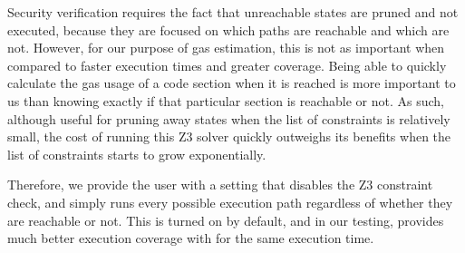 Security verification requires the fact that unreachable states are pruned and not executed, because 
they are focused on which paths are reachable and which are not. However, for our purpose of gas estimation,
this is not as important when compared to faster execution times and greater coverage. Being able to quickly calculate the gas usage of a code section 
when it is reached is more important to us than knowing exactly if that particular section is reachable or not.
As such, although useful for pruning away states when the list of constraints is relatively small, the cost of
running this Z3 solver quickly outweighs its benefits when the list of constraints starts to grow exponentially.

Therefore, we provide the user with a setting that disables the Z3 constraint check, and simply runs
every possible execution path regardless of whether they are reachable or not. This is turned on by default,
and in our testing, provides much better execution coverage with for the same execution time.